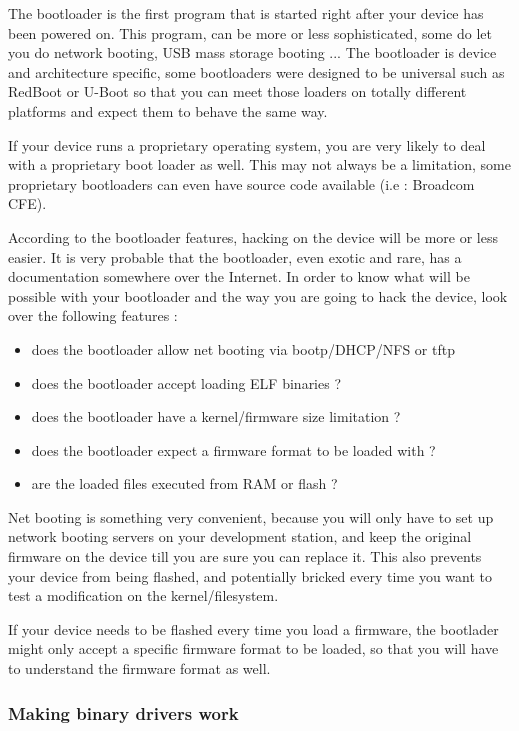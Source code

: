 The bootloader is the first program that is started right after your device has 
been powered on. This program, can be more or less sophisticated, some do let you 
do network booting, USB mass storage booting ... The bootloader is device and 
architecture specific, some bootloaders were designed to be universal such as 
RedBoot or U-Boot so that you can meet those loaders on totally different 
platforms and expect them to behave the same way.

If your device runs a proprietary operating system, you are very likely to deal 
with a proprietary boot loader as well. This may not always be a limitation, 
some proprietary bootloaders can even have source code available (i.e : Broadcom CFE).

According to the bootloader features, hacking on the device will be more or less 
easier. It is very probable that the bootloader, even exotic and rare, has a 
documentation somewhere over the Internet. In order to know what will be possible 
with your bootloader and the way you are going to hack the device, look over the 
following features :

\begin{itemize}
\item does the bootloader allow net booting via bootp/DHCP/NFS or tftp
\item does the bootloader accept loading ELF binaries ?
\item does the bootloader have a kernel/firmware size limitation ?
\item does the bootloader expect a firmware format to be loaded with ?
\item are the loaded files executed from RAM or flash ?
\end{itemize}

Net booting is something very convenient, because you will only have to set up network
booting servers on your development station, and keep the original firmware on the device
till you are sure you can replace it. This also prevents your device from being flashed,
and potentially bricked every time you want to test a modification on the kernel/filesystem.

If your device needs to be flashed every time you load a firmware, the bootlader might
only accept a specific firmware format to be loaded, so that you will have to 
understand the firmware format as well.

\subsubsection{Making binary drivers work}

